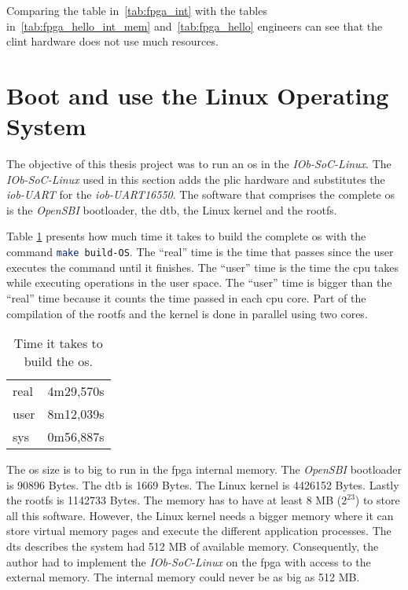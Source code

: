 Comparing the table in~\ref{tab:fpga_int} with the tables in~\ref{tab:fpga_hello_int_mem} and~\ref{tab:fpga_hello} engineers can see that the \acrshort{clint} hardware does not use much resources.

\section{Boot and use the Linux Operating System}
\label{section:boot_linux}
The objective of this thesis project was to run an \acrlong{os} in the \textit{IOb-SoC-Linux}. The \textit{IOb-SoC-Linux} used in this section adds the \acrshort{plic} hardware and substitutes the \textit{iob-UART} for the \textit{iob-UART16550}. The software that comprises the complete \acrshort{os} is the \textit{OpenSBI} bootloader, the \acrlong{dtb}, the Linux kernel and the \acrlong{rootfs}.

Table \ref{tab:time_os} presents how much time it takes to build the complete \acrshort{os} with the command \lstinline[language=sh]{make build-OS}. The \enquote{real} time is the time that passes since the user executes the command until it finishes. The \enquote{user} time is the time the \acrshort{cpu} takes while executing operations in the user space. The \enquote{user} time is bigger than the \enquote{real} time because it counts the time passed in each \acrshort{cpu} core. Part of the compilation of the \acrshort{rootfs} and the kernel is done in parallel using two cores.

\begin{table}[!ht]
    \centering
    \begin{tabular}{ll}
    real & 4m29,570s \\
    user & 8m12,039s \\
    sys  & 0m56,887s
    \end{tabular}
    \caption{Time it takes to build the \acrshort{os}.}
    \label{tab:time_os}
\end{table}

The \acrshort{os} size is to big to run in the \acrshort{fpga} internal memory. The \textit{OpenSBI} bootloader is 90896 Bytes. The \acrlong{dtb} is 1669 Bytes. The Linux kernel is 4426152 Bytes. Lastly the \acrlong{rootfs} is 1142733 Bytes. The memory has to have at least 8 MB ($2^23$) to store all this software. However, the Linux kernel needs a bigger memory where it can store virtual memory pages and execute the different application processes. The \acrlong{dts} describes the system had 512 MB of available memory. Consequently, the author had to implement the \textit{IOb-SoC-Linux} on the \acrshort{fpga} with access to the external memory. The internal memory could never be as big as 512 MB.

